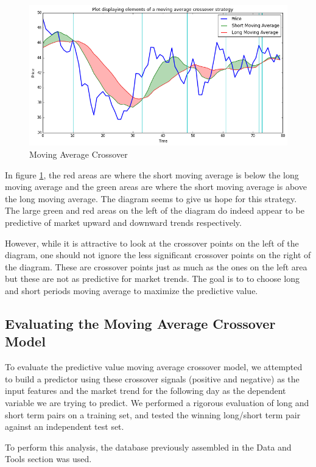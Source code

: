 \documentclass{report}
\begin{document}
\begin{figure}[H]
	\caption{Moving Average Crossover}
	\centerline{\includegraphics[width=\textwidth]{vis/macrossover.png}}
	\label{fig:macrossover}
\end{figure}

In figure \ref{fig:macrossover}, the red areas are where the short moving average is below the long moving average and the green areas are where the short moving average is above the long moving average. The diagram seems to give us hope for this strategy. The large green and red areas on the left of the diagram do indeed appear to be predictive of market upward and downward trends respectively. 

However, while it is attractive to look at the crossover points on the left of the diagram, one should not ignore the less significant crossover points on the right of the diagram. These are crossover points just as much as the ones on the left area but these are not as predictive for market trends. The goal is to to choose long and short periods moving average to maximize the predictive value.

\subsection{Evaluating the Moving Average Crossover Model}

To evaluate the predictive value moving average crossover model, we attempted to build a predictor using these crossover signals (positive and negative) as the input features and the market trend for the following day as the dependent variable we are trying to predict. We performed a rigorous evaluation of long and short term pairs on a training set, and tested the winning long/short term pair against an independent test set.

To perform this analysis, the database previously assembled in the Data and Tools section was used.
\end{document}
